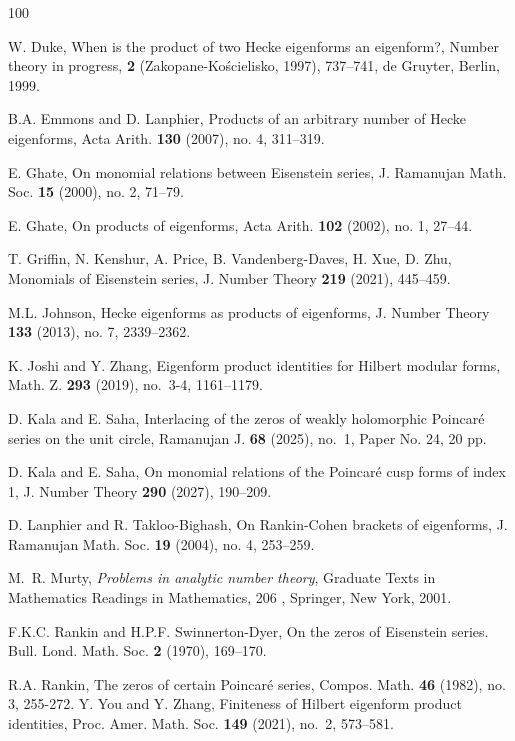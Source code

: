 \documentclass[12pt,reqno]{amsart}
\begin{document}
\begin{thebibliography}{100}


W. Duke, When is the product of two Hecke eigenforms an eigenform?, Number theory in progress, {\bf 2}
(Zakopane-Ko\'scielisko, 1997), 737--741, de Gruyter, Berlin, 1999.


B.A. Emmons and D. Lanphier, Products of an arbitrary number of Hecke eigenforms, Acta Arith. {\bf 130} (2007), no. 4, 311--319.

E. Ghate, On monomial relations between Eisenstein series, J. Ramanujan Math. Soc. {\bf 15} (2000), no. 2, 71--79.

E. Ghate,  On products of eigenforms, Acta Arith. {\bf 102} (2002), no. 1, 27--44.

T. Griffin, N. Kenshur, A. Price, B. Vandenberg-Daves, H. Xue, D. Zhu, Monomials of Eisenstein series, J. Number Theory {\bf 219} (2021), 445--459.

M.L. Johnson, 
Hecke eigenforms as products of eigenforms,
J. Number Theory {\bf 133} (2013), no. 7, 2339--2362.


K. Joshi and Y. Zhang, Eigenform product identities for Hilbert modular forms, Math. Z. {\bf 293} (2019), no.~3-4, 1161--1179.

D. Kala and E. Saha, Interlacing of the zeros of weakly holomorphic Poincar\'e{} series on the unit circle, Ramanujan J. {\bf 68} (2025), no.~1, Paper No. 24, 20 pp.


D. Kala and E. Saha, On monomial relations of the Poincar\'e{} cusp forms of index 1, J. Number Theory {\bf 290} (2027), 190--209.


D. Lanphier and R. Takloo-Bighash,
On Rankin-Cohen brackets of eigenforms,
J. Ramanujan Math. Soc. {\bf 19} (2004), no. 4, 253--259.

M.~R. Murty, {\it Problems in analytic number theory}, Graduate Texts in Mathematics Readings in Mathematics, 206 , Springer, New York, 2001.

F.K.C. Rankin and H.P.F. Swinnerton-Dyer,
On the zeros of Eisenstein series. Bull. Lond. Math. Soc. {\bf 2} (1970), 169--170.

R.A. Rankin,
The zeros of certain Poincar\'e series, Compos. Math. {\bf 46} (1982), no. 3, 255-272.
Y. You and Y. Zhang, Finiteness of Hilbert eigenform product identities, Proc. Amer. Math. Soc. {\bf 149} (2021), no.~2, 573--581.

\end{thebibliography}
\end{document}
